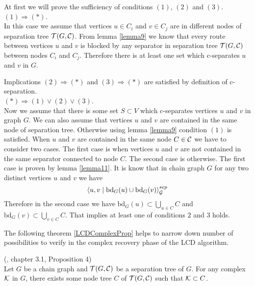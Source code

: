 \begin{prf}
	At first we will prove the sufficiency of conditions $(1)$, $(2)$ and $(3)$. \\ 

	$(1) \Rightarrow (*)$. \\
	In this case we assume that vertices $u \in C_i$ and $v \in C_j$ are in different nodes of separation tree $\mathcal{T}(G, \mathcal{C})$.
	From lemma \ref{lemma9} we know that every route between vertices $u$ and $v$ is blocked by any separator in separation tree
	$\mathcal{T}(G, \mathcal{C})$ between nodes $C_i$ and $C_j$. Therefore there is at least one set which c-separates $u$ and $v$ in $G$.

	Implications $(2) \Rightarrow (*)$ and $(3) \Rightarrow (*)$ are satisfied by definition of c-separation. \\ 

	$(*) \Rightarrow (1) \vee (2) \vee (3) $. \\
	Now we assume that there is some set $S \subset V$ which c-separates vertices $u$ and $v$ in graph $G$.
	We can also assume that vertices $u$ and $v$ are contained in the same node of separation tree. Otherwise
	using lemma \ref{lemma9} condition $(1)$ is satisfied. When $u$ and $v$ are contained in the same node $C \in \mathcal{C}$ we
	have to consider two cases. The first case is when vertices $u$ and $v$ are not contained in the same separator connected to 
	node $C$. The second case is otherwise. The first case is proven by lemma \ref{lemma11}.
	It is know that in chain graph $G$ for any two distinct vertices $u$ and $v$ we have
	\begin{equation}
		\left\langle u , v \mid \mbox{bd}_{G}(u) \cup \mbox{bd}_{G}(v) \right\rangle_{\mathcal{G}}^{sep}
	\end{equation}
	Therefore in the second case we have $\mbox{bd}_{G}(u) \subset \bigcup_{u \in C} C$ and $\mbox{bd}_{G}(v) \subset \bigcup_{v \in C} C$. That
	implies at least one of conditions $2$ and $3$ holds.
	\QED
\end{prf}

 
The following theorem \ref{LCDComplexProp} helps to narrow down number of possibilities to verify 
in the complex recovery phase of the LCD algorithm. 

\begin{thm} \label{LCDComplexProp} (\cite{CG}, chapter 3.1, Proposition 4) \\
	Let $G$ be a chain graph and $\mathcal{T}(G, \mathcal{C})$ be a separation tree of $G$. For any complex $\mathcal{K}$ in $G$, there
	exists some node tree $C$ of $\mathcal{T}(G, \mathcal{C})$ such that $\mathcal{K} \subset C$.
\end{thm}

